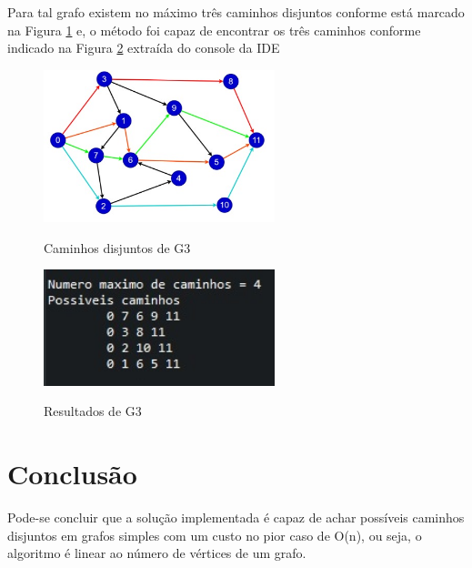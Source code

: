 Para tal grafo existem no máximo três caminhos disjuntos conforme está marcado na Figura \ref{caminhos-grafo3} e, o método foi capaz de encontrar os três caminhos conforme indicado na Figura \ref{solucao-grafo3} extraída do console da IDE

\begin{figure}[H]
    \centering
    \caption{Caminhos disjuntos de G3}
    \includegraphics[width=0.6\textwidth]{figuras/caminhos-grafo3.png}
    \label{caminhos-grafo3}
\end{figure}


\begin{figure}[H]
    \centering
    \caption{Resultados de G3}
    \includegraphics[width=0.6\textwidth]{figuras/solucao-grafo3.png}
    \label{solucao-grafo3}
\end{figure}



\section{\esp Conclusão}

Pode-se concluir que a solução implementada é capaz de achar possíveis caminhos disjuntos em grafos simples com um custo no pior caso de O(n), ou seja, o algoritmo é linear ao número de vértices de um grafo.